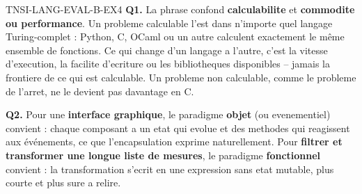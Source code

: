 \begin{corrige}{TNSI-LANG-EVAL-B-EX4}
\textbf{Q1.} La phrase confond \textbf{calculabilite} et \textbf{commodite ou performance}.
Un probleme calculable l'est dans n'importe quel langage Turing-complet : Python, C, OCaml
ou un autre calculent exactement le même ensemble de fonctions. Ce qui change d'un langage a
l'autre, c'est la vitesse d'execution, la facilite d'ecriture ou les bibliotheques
disponibles -- jamais la frontiere de ce qui est calculable. Un probleme non calculable, comme
le probleme de l'arret, ne le devient pas davantage en C.

\textbf{Q2.} Pour une \textbf{interface graphique}, le paradigme \textbf{objet} (ou
evenementiel) convient : chaque composant a un etat qui evolue et des methodes qui reagissent
aux événements, ce que l'encapsulation exprime naturellement. Pour \textbf{filtrer et
transformer une longue liste de mesures}, le paradigme \textbf{fonctionnel} convient : la
transformation s'ecrit en une expression sans etat mutable, plus courte et plus sure a relire.
\end{corrige}
